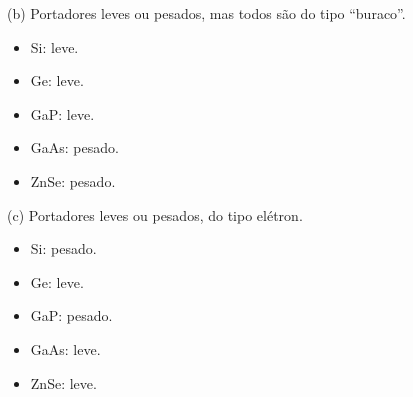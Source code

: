 \documentclass[a4paper,10pt]{article}
\begin{document}
(b) Portadores leves ou pesados, mas todos são do tipo ``buraco''.

\begin{itemize}
\item Si: leve.
\item Ge: leve.
\item GaP: leve.
\item GaAs: pesado.
\item ZnSe: pesado.
\end{itemize}

\n\n

(c) Portadores leves ou pesados, do tipo elétron.

\begin{itemize}
\item Si: pesado.
\item Ge: leve.
\item GaP: pesado.
\item GaAs: leve.
\item ZnSe: leve.
\end{itemize}

\n\n
\end{document}
